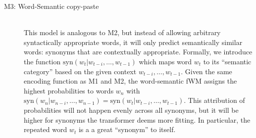 \begin{description}
    \item[M3: Word-Semantic copy-paste]\hfill \\
        This model is analogous to M2, but instead of allowing arbitrary syntactically appropriate words, it will only predict semantically similar words: synonyms that are contextually appropriate.
        \sloppy Formally, we introduce the function $\text{syn}(w_t | w_{t-i}, \dots, w_{t-1})$ which maps word $w_t$ to its ``semantic category'' based on the given context $w_{t-i}, \dots, w_{t-1}$.
        \sloppy Given the same encoding function as M1 and M2, the word-semantic fWM assigns the highest probabilities to words $w_n$ with $\text{syn}(w_n | w_{n-i}, \dots, w_{n-1}) = \text{syn}(w_t | w_{t-i}, \dots, w_{t-1})$.
        This attribution of probabilities will not happen evenly across all synonyms, but it will be higher for synonyms the transformer deems more fitting.
        In particular, the repeated word $w_t$ is a a great ``synonym'' to itself.

\end{description}

\newpage
